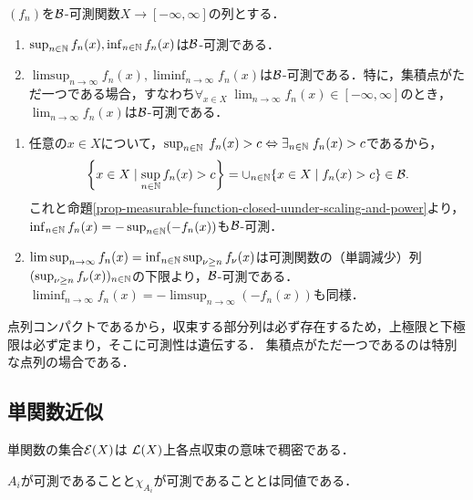 \documentclass[uplatex, dvipdfmx]{jsreport}
\begin{document}
\begin{proposition}[極限構成]\label{prop-limit-of-sequence-of-measurable-function}
    $(f_n)$を$\mathcal{B}$-可測関数$X\to[-\infty,\infty]$の列とする．
    \begin{enumerate}
        \item $\sup_{n\in\mathbb{N}}f_n(x),\inf_{n\in\mathbb{N}}f_n(x)$は$\mathcal{B}$-可測である．
        \item $\limsup_{n\to\infty}f_n(x),\liminf_{n\to\infty}f_n(x)$は$\mathcal{B}$-可測である．特に，集積点がただ一つである場合，すなわち$\forall_{x\in X}\;\lim_{n\to\infty}f_n(x)\in[-\infty,\infty]$のとき，$\lim_{n\to\infty}f_n(x)$は$\mathcal{B}$-可測である．
    \end{enumerate}
\end{proposition}
\begin{Proof}\mbox{}
    \begin{enumerate}
        \item 任意の$x\in X$について，$\sup_{n\in\mathbb{N}}\;f_n(x)>c\Leftrightarrow\exists_{n\in\mathbb{N}}\;f_n(x)>c$であるから，
        \[\left\{x\in X\mid\sup_{n\in\mathbb{N}}f_n(x)>c\right\}=\cup_{n\in\mathbb{N}}\{x\in X\mid f_n(x)>c\}\in\mathcal{B}.\]
        これと命題\ref{prop-measurable-function-closed-uunder-scaling-and-power}より，$\inf_{n\in\mathbb{N}}f_n(x)=-\sup_{n\in\mathbb{N}}(-f_n(x))$も$\mathcal{B}$-可測．
        \item 
        $\limsup_{n\to\infty}f_n(x)=\inf_{n\in\mathbb{N}}\sup_{\nu\ge n}f_\nu(x)$は可測関数の（単調減少）列$(\sup_{\nu\ge n}f_\nu(x))_{n\in\mathbb{N}}$の下限より，$\mathcal{B}$-可測である．
        $\liminf_{n\to\infty}f_n(x)=-\limsup_{n\to\infty}(-f_n(x))$も同様．
    \end{enumerate}
\end{Proof}
\begin{remarks}
    点列コンパクトであるから，収束する部分列は必ず存在するため，上極限と下極限は必ず定まり，そこに可測性は遺伝する．
    集積点がただ一つであるのは特別な点列の場合である．
\end{remarks}

\subsection{単関数近似}

\begin{tcolorbox}[colframe=ForestGreen, colback=ForestGreen!10!white,breakable,colbacktitle=ForestGreen!40!white,coltitle=black,fonttitle=\bfseries\sffamily,
title=]
    単関数の集合$\mathcal{E}(X)$は
    $\mathcal{L}(X)$上各点収束の意味で稠密である．
    
    $A_i$が可測であることと$\chi_{A_i}$が可測であることとは同値である．
\end{tcolorbox}
\end{document}
